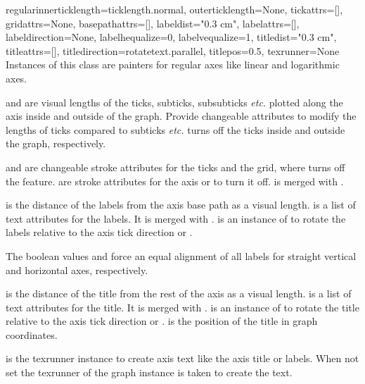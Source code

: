 \begin{classdesc}{regular}{innerticklength=ticklength.normal,
                           outerticklength=None,
                           tickattrs=[],
                           gridattrs=None,
                           basepathattrs=[],
                           labeldist="0.3 cm",
                           labelattrs=[],
                           labeldirection=None,
                           labelhequalize=0,
                           labelvequalize=1,
                           titledist="0.3 cm",
                           titleattrs=[],
                           titledirection=rotatetext.parallel,
                           titlepos=0.5,
                           texrunner=None}
  Instances of this class are painters for regular axes like linear
  and logarithmic axes.

   and  are visual \PyX{}
  lengths of the ticks, subticks, subsubticks \emph{etc.} plotted
  along the axis inside and outside of the graph. Provide changeable
  attributes to modify the lengths of ticks compared to subticks
  \emph{etc.}  turns off the ticks inside and outside the
  graph, respectively.

   and  are changeable stroke attributes
  for the ticks and the grid, where  turns off the feature.
   are stroke attributes for the axis or
   to turn it off.  is merged with
  .

   is the distance of the labels from the axis base path
  as a visual \PyX{} length.  is a list of text
  attributes for the labels. It is merged with
  .
   is an instance of  to rotate
  the labels relative to the axis tick direction or .

  The boolean values  and 
  force an equal alignment of all labels for straight vertical and
  horizontal axes, respectively.

   is the distance of the title from the rest of the
  axis as a visual \PyX{} length.  is a list of text
  attributes for the title. It is merged with
  .
   is an instance of  to rotate
  the title relative to the axis tick direction or .
   is the position of the title in graph coordinates.

   is the texrunner instance to create axis text like
  the axis title or labels. When not set the texrunner of the graph
  instance is taken to create the text.
\end{classdesc}

